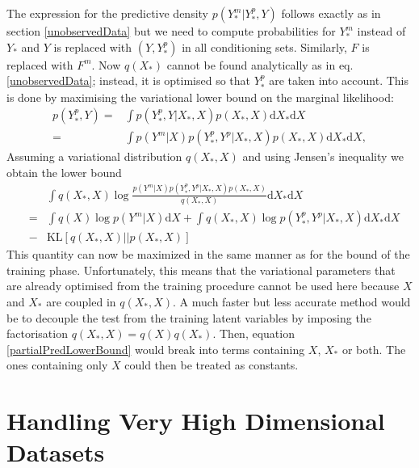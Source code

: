 \documentclass{article} %
\begin{document}
The expression for the predictive density $p(Y_*^m | Y_*^p, Y)$ follows exactly as in section \ref{unobservedData} but we need to compute probabilities for $Y_*^m$ instead of $Y_*$ and $Y$ is replaced with $(Y, Y_*^p)$ in all conditioning sets. Similarly, $F$ is replaced with $F^m$. Now $q(X_*)$ cannot be found analytically as in eq. \ref{unobservedData}; instead, it is optimised so that $Y_*^p$ are taken into account. This is done by maximising the variational lower bound on the marginal likelihood:
\begin{align}
p(Y_*^p, Y) ={}&  \int p(Y_*^p, Y|X_*, X) p(X_*, X) \text{d} X_* \text{d} X \nonumber \\
			={}&  \int p(Y^m | X) p(Y_*^p, Y^p|X_*, X) p(X_*, X) \text{d} X_* \text{d} X,  \nonumber
\end{align}  
Assuming a variational distribution 
$q(X_*, X)$ and using Jensen's inequality we obtain the 
lower bound 
\begin{eqnarray}
& & \int q(X_*, X) \log \frac{ p(Y^m | X) 
p(Y_*^p, Y^p|X_*, X) p(X_*,X)}{ q(X_*, X)} \text{d} X_* \text{d} X \nonumber \\ 
& = & \int q(X) \log p(Y^m | X) \text{d} X 
+  \int q(X_*,X) \log p(Y_*^p, Y^p|X_*, X) \text{d} X_* \text{d} X  \nonumber \\
& - & \text{KL}[q(X_*,X) || p(X_*, X)] \label{partialPredLowerBound}
\end{eqnarray}  
%
This quantity can now be maximized in the same manner as for the bound
of the training phase. Unfortunately, this means that the variational
parameters that are already optimised from the training procedure
cannot be used here because $X$ and $X_*$ are coupled in $q(X_*,X)$. A
much faster but less accurate method would be to decouple the test
from the training latent variables by imposing the factorisation
$q(X_*, X) = q(X) q(X_*)$. Then, equation
\eqref{partialPredLowerBound} would break into terms containing $X$,
$X_*$ or both. The ones containing only $X$ could then be treated as
constants.


\section{Handling Very High Dimensional Datasets}
\end{document}
